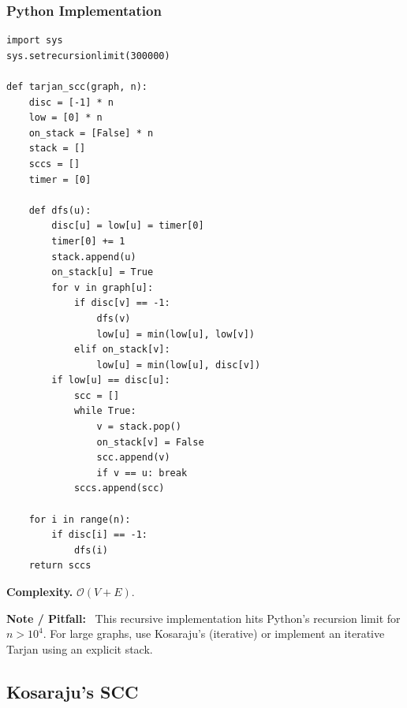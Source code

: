 \documentclass[10pt,a4paper]{article}
\theoremstyle{cpstyle}
\newenvironment{cpnote}{%
  \begin{mdframed}[backgroundcolor=notebg, linecolor=orange!70, linewidth=1pt,
    innerleftmargin=10pt, innerrightmargin=10pt, innertopmargin=6pt, innerbottommargin=6pt]
  \textbf{\color{orange!80!black}Note / Pitfall:}~}{%
  \end{mdframed}}
\newcommand{\bigO}[1]{\mathcal{O}\!\left(#1\right)}
\begin{document}
\subsubsection{Python Implementation}
\begin{lstlisting}[caption={Tarjan's Strongly Connected Components}]
import sys
sys.setrecursionlimit(300000)

def tarjan_scc(graph, n):
    disc = [-1] * n
    low = [0] * n
    on_stack = [False] * n
    stack = []
    sccs = []
    timer = [0]

    def dfs(u):
        disc[u] = low[u] = timer[0]
        timer[0] += 1
        stack.append(u)
        on_stack[u] = True
        for v in graph[u]:
            if disc[v] == -1:
                dfs(v)
                low[u] = min(low[u], low[v])
            elif on_stack[v]:
                low[u] = min(low[u], disc[v])
        if low[u] == disc[u]:
            scc = []
            while True:
                v = stack.pop()
                on_stack[v] = False
                scc.append(v)
                if v == u: break
            sccs.append(scc)

    for i in range(n):
        if disc[i] == -1:
            dfs(i)
    return sccs
\end{lstlisting}

\textbf{Complexity.} $\bigO{V+E}$.

\begin{cpnote}
This recursive implementation hits Python's recursion limit for $n > 10^4$. For large graphs, use Kosaraju's (iterative) or implement an iterative Tarjan using an explicit stack.
\end{cpnote}

\subsection{Kosaraju's SCC}
\end{document}
